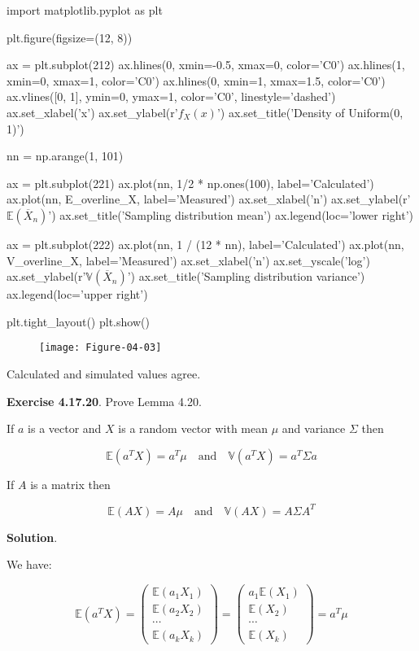 \begin{python}
import matplotlib.pyplot as plt

plt.figure(figsize=(12, 8))

ax = plt.subplot(212)
ax.hlines(0, xmin=-0.5, xmax=0, color='C0')
ax.hlines(1, xmin=0, xmax=1, color='C0')
ax.hlines(0, xmin=1, xmax=1.5, color='C0')
ax.vlines([0, 1], ymin=0, ymax=1, color='C0', linestyle='dashed')
ax.set_xlabel('x')
ax.set_ylabel(r'$f_X(x)$')
ax.set_title('Density of Uniform(0, 1)')

nn = np.arange(1, 101)

ax = plt.subplot(221)
ax.plot(nn, 1/2 * np.ones(100), label='Calculated')
ax.plot(nn, E_overline_X, label='Measured')
ax.set_xlabel('n')
ax.set_ylabel(r'$\mathbb{E}(\overline{X}_n)$')
ax.set_title('Sampling distribution mean')
ax.legend(loc='lower right')

ax = plt.subplot(222)
ax.plot(nn, 1 / (12 * nn), label='Calculated')
ax.plot(nn, V_overline_X, label='Measured')
ax.set_xlabel('n')
ax.set_yscale('log')
ax.set_ylabel(r'$\mathbb{V}(\overline{X}_n)$')
ax.set_title('Sampling distribution variance')
ax.legend(loc='upper right')

plt.tight_layout()
plt.show()
\end{python}

\begin{figure}[H]
\texttt{[image: Figure-04-03]}
\end{figure}

Calculated and simulated values agree.

\textbf{Exercise 4.17.20}. Prove Lemma 4.20.

If \(a\) is a vector and \(X\) is a random vector with mean \(\mu\) and
variance \(\Sigma\) then

\[ \mathbb{E}(a^T X) = a^T \mu
\quad \text{and} \quad
\mathbb{V}(a^T X) = a^T \Sigma a \]

If \(A\) is a matrix then

\[ \mathbb{E}(A X) = A \mu
\quad \text{and} \quad
\mathbb{V}(AX) = A \Sigma A^T \]

\textbf{Solution}.

We have:

\[ \mathbb{E}(a^T X) = \begin{pmatrix}
\mathbb{E}(a_1 X_1) \\
\mathbb{E}(a_2 X_2) \\
\cdots \\
\mathbb{E}(a_k X_k)
\end{pmatrix} = \begin{pmatrix}
a_1 \mathbb{E}(X_1) \\
\mathbb{E}(X_2) \\
\cdots \\
\mathbb{E}(X_k)
\end{pmatrix} = a^T \mu \]

